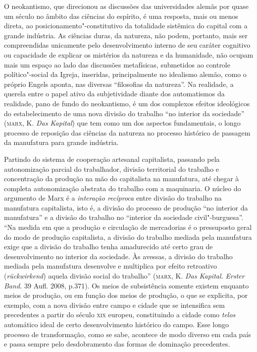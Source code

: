 O neokantismo, que direcionou as discussões das universidades alemãs por
quase um século no âmbito das ciências do espírito, é uma resposta, mais
ou menos direta, ao posicionamento"-constitutivo da totalidade
sistêmica do capital com a grande indústria. As ciências duras, da
natureza, não podem, portanto, mais ser compreendidas unicamente pelo
desenvolvimento interno de seu caráter cognitivo ou capacidade de
explicar os mistérios da natureza e da humanidade, não ocupam mais um
espaço ao lado das discussões metafísicas, submetidos ao controle
político"-social da Igreja, inseridas, principalmente no idealismo
alemão, como o próprio Engels aponta, nas diversas ``filosofias da
natureza''. Na realidade, a querela entre o papel ativo da subjetividade
diante dos automatismos da realidade, pano de fundo do neokantismo, é um
dos complexos efeitos ideológicos do estabelecimento de uma nova divisão
do trabalho ``no interior da sociedade'' (\textsc{marx}, K. \emph{Das
Kapital}) que tem como um dos aspectos fundamentais, o longo processo de
reposição das ciências da natureza no processo histórico de passagem da
manufatura para grande indústria.

Partindo do sistema de cooperação artesanal capitalista, passando pela
autonomização parcial do trabalhador, divisão territorial do trabalho e
concentração da produção na mão do capitalista na manufatura, até chegar
à completa autonomização abstrata do trabalho com a maquinaria. O núcleo
do argumento de Marx é a \emph{interação recíproca} entre divisão do
trabalho na manufatura capitalista, isto é, a divisão do processo de
produção ``no interior da manufatura'' e a divisão do trabalho no
``interior da sociedade civil"-burguesa''. ``Na medida em que a produção
e circulação de mercadorias é o pressuposto geral do modo de produção
capitalista, a divisão do trabalho mediada pela manufatura exige que a
divisão do trabalho tenha amadurecido até certo grau de desenvolvimento
no interior da sociedade. Às avessas, a divisão do trabalho mediada pela
manufatura desenvolve e multiplica por efeito retroativo
(\emph{rückwirkend}) aquela divisão social do trabalho'' (\textsc{marx},
K. \emph{Das Kapital.} \emph{Erster Band.} 39 Aufl. 2008, p.371). Os
meios de subsistência somente existem enquanto meios de produção, ou em
função dos meios de produção, o que se explicita, por exemplo, com a
nova divisão entre campo e cidade que se intensifica sem precedentes a
partir do século \textsc{xix} europeu, constituindo a cidade como
\emph{telos} automático ideal de certo desenvolvimento histórico do
campo. Esse longo processo de transformação, como se sabe, acontece de
modo diverso em cada país e passa sempre pelo desdobramento das formas
de dominação precedentes.

